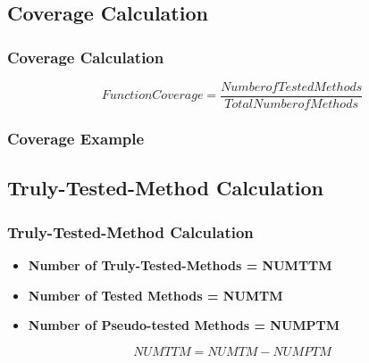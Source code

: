 \subsection{Coverage Calculation}
\begin{frame}
\frametitle{Coverage Calculation}
\begin{center}
  \begin{equation*}
    FunctionCoverage = \frac{Number of Tested Methods}{Total Number of Methods}
  \end{equation*}
\end{center}
\end{frame}

\begin{frame}
  \frametitle{Coverage Example}
  \begin{center}

  \begin{table}[htbp]

  \end{table}

  \end{center}
\end{frame}

\subsection{Truly-Tested-Method Calculation}
\begin{frame}
  \frametitle{Truly-Tested-Method Calculation}
  \begin{itemize}
    \item \textbf{Number of Truly-Tested-Methods = NUMTTM}

    \item \textbf{Number of Tested Methods = NUMTM}

    \item \textbf{Number of Pseudo-tested Methods = NUMPTM}
  \end{itemize}

  \begin{center}
    \begin{equation*}
      NUMTTM = NUMTM - NUMPTM
    \end{equation*}
  \end{center}
\end{frame}

